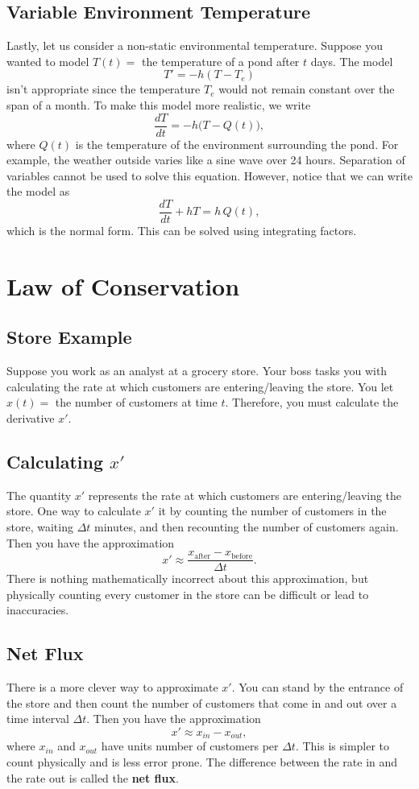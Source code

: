 \documentclass[09pt,letterpaper]{article}
\begin{document}
\subsection{Variable Environment Temperature}
Lastly, let us consider a non-static environmental temperature. Suppose you wanted to model $T(t)=$ the temperature of a pond after $t$ days. The model
$$
    T'=-h(T-T_e)
$$
isn't appropriate since the temperature $T_e$ would not remain constant over the span of a month. To make this model more realistic, we write
\[
\frac{dT}{dt}=-h\bigl(T-Q(t)\bigr),
\]
where $Q(t)$ is the temperature of the environment surrounding the pond. For example, the weather outside varies like a sine wave over 24 hours. Separation of variables cannot be used to solve this equation. However, notice that we can write the model as 
$$
\frac{dT}{dt} + hT=h\,Q(t),
$$
which is the normal form. This can be solved using integrating factors.

\section{Law of Conservation}

\subsection{Store Example}
Suppose you work as an analyst at a grocery store. Your boss tasks you with calculating the rate at which customers are entering/leaving the store. You let $x(t)=$ the number of customers at time $t$. Therefore, you must calculate the derivative $x'$.

\subsection{Calculating $x'$}
The quantity $x'$ represents the rate at which customers are entering/leaving the store. One way to calculate $x'$ it by counting the number of customers in the store, waiting $\Delta t$ minutes, and then recounting the number of customers again. Then you have the approximation
$$
x' \approx \frac{x_{\text{after}}-x_{\text{before}} }{\Delta t}.
$$
There is nothing mathematically incorrect about this approximation, but physically counting every customer in the store can be difficult or lead to inaccuracies. 

\subsection{Net Flux}
There is a more clever way to approximate $x'$. You can stand by the entrance of the store and then count the number of customers that come in and out over a time interval $\Delta t$. Then you have the approximation 
$$
x' \approx   x_{in} -x_{out},
$$
where $x_{in}$ and $x_{out}$ have units number of customers per $\Delta t$. This is simpler to count physically and is less error prone. The difference between the rate in and the rate out is called the \textbf{net flux}. 
\end{document}
